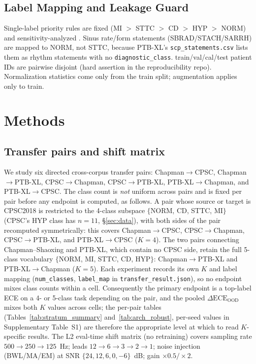 \documentclass[final,5p,times,nonatbib]{elsarticle}
\begin{document}
\subsection{Label Mapping and Leakage Guard}
Single-label priority rules are fixed (MI $>$ STTC $>$ CD $>$ HYP $>$ NORM)
and sensitivity-analyzed \cite{wagner2020ptbxl,reyna2022}. Sinus rate/form
statements (SBRAD/STACH/SARRH) are mapped to NORM, not STTC, because
PTB-XL's \texttt{scp\_statements.csv} lists them as rhythm statements
with no \texttt{diagnostic\_class}. train\slash val\slash cal\slash test patient IDs are
pairwise disjoint (hard assertion in the reproducibility repo).
Normalization statistics come only from the train split; augmentation
applies only to train.

\section{Methods}
\label{sec:methods}
\subsection{Transfer pairs and shift matrix}
\label{sec:shiftmatrix}
We study six directed cross-corpus transfer pairs:
Chapman$\rightarrow$CPSC, Chapman$\rightarrow$PTB-XL,
CPSC$\rightarrow$Chapman, CPSC$\rightarrow$PTB-XL,
PTB-XL$\rightarrow$Chapman, and PTB-XL$\rightarrow$CPSC. The class
count is \emph{not} uniform across pairs and is fixed per pair before
any endpoint is computed, as follows. A pair whose source or target is
CPSC2018 is restricted to the 4-class subspace
$\{$NORM, CD, STTC, MI$\}$ (CPSC's HYP class has $n=11$,
\S\ref{sec:data}), with both sides of the pair recomputed symmetrically:
this covers Chapman$\rightarrow$CPSC, CPSC$\rightarrow$Chapman,
CPSC$\rightarrow$PTB-XL, and PTB-XL$\rightarrow$CPSC ($K=4$). The two
pairs connecting Chapman--Shaoxing and PTB-XL, which contain no CPSC
side, retain the full 5-class vocabulary
$\{$NORM, MI, STTC, CD, HYP$\}$: Chapman$\rightarrow$PTB-XL and
PTB-XL$\rightarrow$Chapman ($K=5$). Each experiment records its own
$K$ and label mapping (\texttt{num\_classes}, \texttt{label\_map} in
\texttt{transfer\_result.json}), so no endpoint mixes class counts
within a cell. Consequently the primary endpoint is a top-label ECE on
a 4- or 5-class task depending on the pair, and the pooled
$\Delta\text{ECE}_{\text{OOD}}$ mixes both $K$ values across cells; the
per-pair tables (Tables~\ref{tab:stratum_summary} and~\ref{tab:arch_robust}, per-seed values in Supplementary Table~S1)
are therefore the appropriate level at which to read $K$-specific
results. The L2 eval-time shift matrix (no retraining)
covers sampling rate $500\rightarrow250\rightarrow125$~Hz; leads
$12\rightarrow6\rightarrow3\rightarrow2\rightarrow1$; noise injection
(BWL/MA/EM) at SNR $\{24,12,6,0,-6\}$~dB; gain $\times0.5/\times2$.
\end{document}
